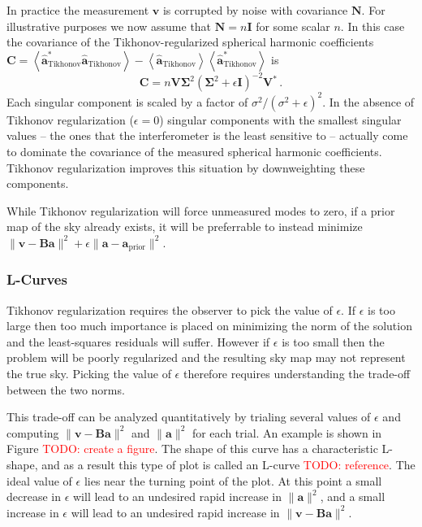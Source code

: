 \documentclass[twocolumn]{aastex6}
\renewcommand{\b}{\pmb}
\newcommand{\atikh}{\b{\hat a}_\text{Tikhonov}}
\newcommand{\todo}[1]{\textcolor{red}{TODO: #1}\PackageWarning{TODO:}{#1!}}
\begin{document}
In practice the measurement $\b v$ is corrupted by noise with covariance $\b N$. For illustrative
purposes we now assume that $\b N=n\b I$ for some scalar $n$. In this case the covariance of the
Tikhonov-regularized spherical harmonic coefficients $\b C = \left\langle\atikh^*\atikh\right\rangle
- \left\langle\atikh\right\rangle\left\langle\atikh^*\right\rangle$ is
\begin{equation}
    \b C = n \b V \b\Sigma^2 (\b\Sigma^2 + \epsilon\b I)^{-2} \b V^*\,.
\end{equation}
Each singular component is scaled by a factor of $\sigma^2/(\sigma^2 + \epsilon)^2$.
In the absence of Tikhonov regularization ($\epsilon=0$)
singular components with the smallest singular values -- the ones that the interferometer is
the least sensitive to -- actually come to dominate the covariance of the measured spherical
harmonic coefficients. Tikhonov regularization improves this situation by downweighting these
components.

While Tikhonov regularization will force unmeasured modes to zero, if a prior map of the sky already
exists, it will be preferrable to instead minimize $\|\b v - \b B\b a\|^2 + \epsilon \|\b a-\b
a_\text{prior}\|^2$.

\subsubsection{L-Curves}

Tikhonov regularization requires the observer to pick the value of $\epsilon$. If $\epsilon$ is too
large then too much importance is placed on minimizing the norm of the solution and the
least-squares residuals will suffer. However if $\epsilon$ is too small then the problem will be
poorly regularized and the resulting sky map may not represent the true sky. Picking the value of
$\epsilon$ therefore requires understanding the trade-off between the two norms.

This trade-off can be analyzed quantitatively by trialing several values of $\epsilon$ and computing
$\|\b v - \b B\b a\|^2$ and $\|\b a\|^2$ for each trial. An example is shown in Figure \todo{create
a figure}. The shape of this curve has a characteristic L-shape, and as a result this type of plot
is called an L-curve \todo{reference}. The ideal value of $\epsilon$ lies near the turning point of
the plot. At this point a small decrease in $\epsilon$ will lead to an undesired rapid increase in
$\|\b a\|^2$, and a small increase in $\epsilon$ will lead to an undesired rapid increase in $\|\b v
- \b B\b a\|^2$.
\end{document}

